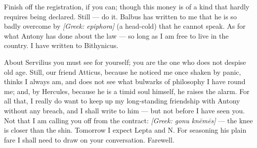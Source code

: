 

 Finish off the registration, if you can; though this money is of a kind that hardly requires being declared. Still --- do it. Balbus has written to me that he is so badly overcome by \textit{[Greek: epiphora]} (a head-cold) that he cannot speak. As for what Antony has done about the law --- so long as I am free to live in the country. I have written to Bithynicus.

 About Servilius you must see for yourself; you are the one who does not despise old age. Still, our friend Atticus, because he noticed me once shaken by panic, thinks I always am, and does not see what bulwarks of philosophy I have round me; and, by Hercules, because he is a timid soul himself, he raises the alarm. For all that, I really do want to keep up my long-standing friendship with Antony without any breach, and I shall write to him --- but not before I have seen you. Not that I am calling you off from the contract: \textit{[Greek: gonu kn\=em\=es]} --- the knee is closer than the shin. Tomorrow I expect Lepta and \dag N. For seasoning his plain fare I shall need to draw on your conversation. Farewell.
